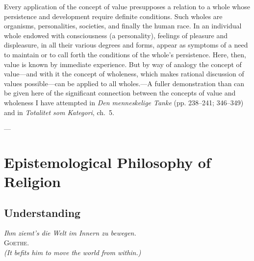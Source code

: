 \documentclass[12pt,a4paper]{book}
\newcommand{\opage}[1]{\marginnote{\footnotesize\textit{[#1]}}}
\begin{document}
Every application of the concept of value presupposes a relation to a
whole whose persistence and development require definite conditions.
Such wholes are organisms, personalities, societies, and finally the
human race. In an individual whole endowed with consciousness (a
personality), feelings of pleasure and displeasure, in all their various
degrees and forms, appear as symptoms of a need to maintain or to call
forth the conditions of the whole's persistence. Here, then, value is
known by immediate experience. But by way of analogy the concept of
value---and with it the concept of wholeness, which makes rational
discussion of values possible---can be applied to all wholes.---A fuller
demonstration than can be given here of the significant connection
between the concepts of value and wholeness I have attempted in
\emph{Den menneskelige Tanke} (pp. 238--241; 346--349) and in
\emph{Totalitet som Kategori}, ch.~5.

\begin{center}---\end{center}


\chapter[Epistemological Philosophy of Religion]{Epistemological Philosophy of Religion\opage{13}}
\label{ch:epistemology}

\section{Understanding}
\label{sec:understanding}

\begin{flushright}
\opage{15}
\textit{Ihm ziemt's die Welt im Innern zu bewegen.}\\[2pt]
\textsc{Goethe}.\\[2pt]
\textit{(It befits him to move the world from within.)}
\end{flushright}

\bigskip
\end{document}
